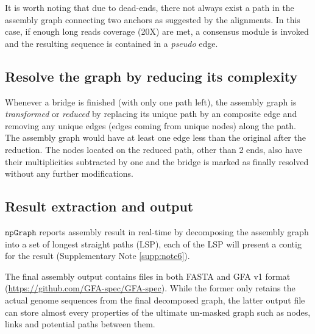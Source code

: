 \documentclass[10pt,twocolumn,twoside]{genpaper}
\newcommand{\npgraph}{$\mathtt{npGraph}$}
\begin{document}
It is worth noting that due to dead-ends, there not always exist a path in the assembly graph connecting two anchors as suggested by the alignments. In this case, if enough long reads coverage (20X) are met, a consensus module is invoked and the resulting sequence is contained in a \emph{pseudo} edge.
\subsection{Resolve the graph by reducing its complexity}

Whenever a bridge is finished (with only one path left), the assembly graph is \emph{transformed} or \emph{reduced} by replacing its unique path by an composite edge and removing any unique edges (edges coming from unique nodes) along the path. The assembly graph would have at least one edge less than the original after the reduction. The nodes located on the reduced path, other than 2 ends, also have their multiplicities subtracted by one and the bridge is marked as finally resolved without any further modifications. 

\subsection*{Result extraction and output}
\npgraph{} reports assembly result in real-time by decomposing the assembly graph into a set of longest straight paths (LSP), each of the LSP will present a contig for the result (Supplementary Note \ref{supp:note6}).

The final assembly output contains files in both FASTA and GFA v1 format (\url{https://github.com/GFA-spec/GFA-spec}). While the former only retains the actual genome sequences from the final decomposed graph, the latter output file can store almost every properties of the ultimate un-masked graph such as nodes, links and potential paths between them.



 
\end{document}
